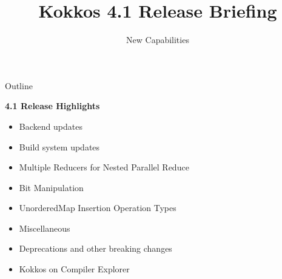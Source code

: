 
\usepackage{tikz}
\graphicspath{{4_0/figures/}}

\title{Kokkos 4.1 Release Briefing}

\author{New Capabilities}




\shorttrue
\mediumfalse
\fullfalse



\begin{frame}
        \titlepage
\end{frame}


\begin{frame}[fragile]{Outline}

\textbf{4.1 Release Highlights}

    \begin{itemize}
      \item{Backend updates}
      \item{Build system updates}
      \item{Multiple Reducers for Nested Parallel Reduce}
      \item{Bit Manipulation}
      \item{UnorderedMap Insertion Operation Types}
      \item{Miscellaneous}
      \item{Deprecations and other breaking changes}
      \item{Kokkos on Compiler Explorer}
    \end{itemize}

\end{frame}


